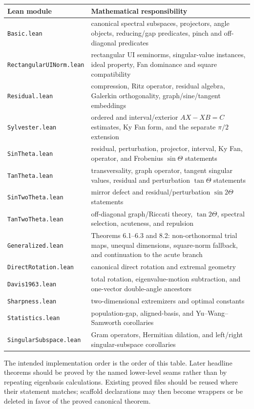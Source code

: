 \documentclass[11pt]{article}
\theoremstyle{remark}
\begin{document}
\begin{longtable}{p{}p{}}
\toprule
Lean module & Mathematical responsibility \\
\midrule
\texttt{Basic.lean} & canonical spectral subspaces, projectors, angle objects,
reducing/gap predicates, pinch and off-diagonal predicates \\
\texttt{RectangularUINorm.lean} & rectangular UI seminorms, singular-value
instances, ideal property, Fan dominance and square compatibility \\
\texttt{Residual.lean} & compression, Ritz operator, residual algebra,
Galerkin orthogonality, graph/sine/tangent embeddings \\
\texttt{Sylvester.lean} & ordered and interval/exterior \(AX-XB=C\) estimates,
Ky Fan form, and the separate \(\pi/2\) extension \\
\texttt{SinTheta.lean} & residual, perturbation, projector, interval, Ky Fan,
operator, and Frobenius \(\sin\Theta\) statements \\
\texttt{TanTheta.lean} & transversality, graph operator, tangent singular values,
residual and perturbation \(\tan\Theta\) statements \\
\texttt{SinTwoTheta.lean} & mirror defect and residual/perturbation
\(\sin2\Theta\) statements \\
\texttt{TanTwoTheta.lean} & off-diagonal graph/Riccati theory,
\(\tan2\Theta\), spectral selection, acuteness, and repulsion \\
\texttt{Generalized.lean} & Theorems 6.1--6.3 and 8.2:
non-orthonormal trial maps, unequal dimensions, square-norm fallback, and
continuation to the acute branch \\
\texttt{DirectRotation.lean} & canonical direct rotation and extremal geometry \\
\texttt{Davis1963.lean} & total rotation, eigenvalue-motion subtraction, and
one-vector double-angle ancestors \\
\texttt{Sharpness.lean} & two-dimensional extremizers and optimal constants \\
\texttt{Statistics.lean} & population-gap, aligned-basis, and
Yu--Wang--Samworth corollaries \\
\texttt{SingularSubspace.lean} & Gram operators, Hermitian dilation, and
left/right singular-subspace corollaries \\
\bottomrule
\end{longtable}

The intended implementation order is the order of this table.  Later headline
theorems should be proved by the named lower-level seams rather than by
repeating eigenbasis calculations.  Existing proved files should be reused
where their statement matches; scaffold declarations may then become wrappers
or be deleted in favor of the proved canonical theorem.
\end{document}
